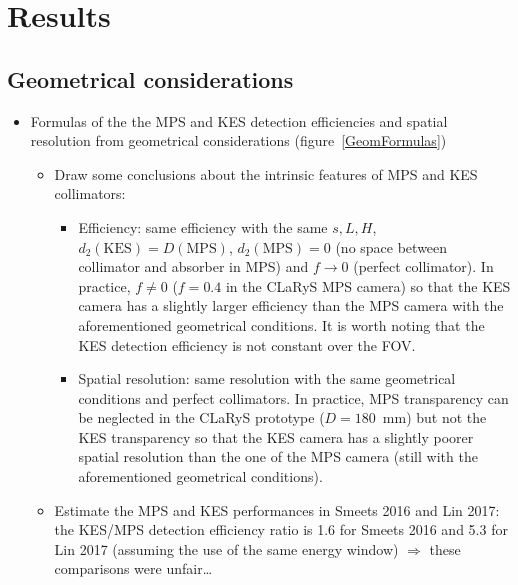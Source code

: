 \documentclass[a4paper,english]{article}
\begin{document}


\section{Results}

\subsection{Geometrical considerations}

\begin{itemize}
  \item Formulas of the the MPS and KES detection efficiencies and spatial resolution from geometrical considerations (figure~\ref{GeomFormulas})
  \begin{itemize}
    \item Draw some conclusions about the intrinsic features of MPS and KES collimators:  
    \begin{itemize}
      \item Efficiency: same efficiency with the same $s, L, H$, $d_2(\text{KES}) = D(\text{MPS})$, $d_2(\text{MPS})=0$ (no space between collimator and absorber in MPS) and $f\longrightarrow0$ (perfect collimator). In practice, $f\ne 0$ ($f=0.4$ in the CLaRyS MPS camera) so that the KES camera has a slightly larger efficiency than the MPS camera with the aforementioned geometrical conditions. It is worth noting that the KES detection efficiency is not constant over the FOV.
      \item Spatial resolution: same resolution with the same geometrical conditions and perfect collimators. In practice, MPS transparency can be neglected in the CLaRyS prototype ($D = 180$~mm) but not the KES transparency so that the KES camera has a slightly poorer spatial resolution than the one of the MPS camera (still with the aforementioned geometrical conditions).
    \end{itemize}       
    \item Estimate the MPS and KES performances in Smeets 2016 and Lin 2017: the KES/MPS detection efficiency ratio is 1.6 for Smeets 2016 and 5.3 for Lin 2017 (assuming the use of the same energy window) $\Rightarrow$ these comparisons were unfair\dots   
  \end{itemize}
\end{itemize}
\end{document}
